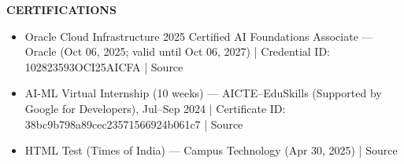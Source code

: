 \documentclass[a4paper,10pt]{article}
\newcommand{\resheading}[1]{
  \vspace{8pt}
  {\color{black} \textbf{\large #1}}
  \vspace{-5pt}
  \hrulefill
  \vspace{3pt}
}
\newcommand{\resitem}[1]{
  \item \small{
    {#1 \vspace{-2pt}}
  }
}
\begin{document}




\resheading{CERTIFICATIONS}
\begin{itemize}[leftmargin=12pt,nosep,topsep=2pt]
  \resitem{Oracle Cloud Infrastructure 2025 Certified AI Foundations Associate — Oracle (Oct 06, 2025; valid until Oct 06, 2027) | Credential ID: 102823593OCI25AICFA | Source}
  \resitem{AI-ML Virtual Internship (10 weeks) — AICTE–EduSkills (Supported by Google for Developers), Jul–Sep 2024 | Certificate ID: 38bc9b798a89cec23571566924b061c7 | Source}
  \resitem{HTML Test (Times of India) — Campus Technology (Apr 30, 2025) | Source}
\end{itemize}
\end{document}
